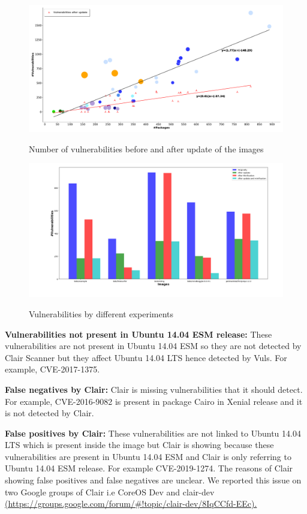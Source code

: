 \documentclass[a4paper,num-refs]{oup-contemporary}
\begin{document}
\begin{figure}[!ht]
        {\includegraphics[width=\textwidth]
        {Figures/vulnwithupdate.pdf}}
        \caption{\label{fig:graph2} Number of vulnerabilities before and
        after update of the images}
      \end{figure}


\begin{figure}[!ht]
        {\includegraphics[scale=1.5,width=\textwidth]
        {Figures/bargraph.png}}
        \caption{\label{fig:bargraph} Vulnerabilities by different experiments}
      \end{figure}
\textbf{Vulnerabilities not present in Ubuntu 14.04 ESM release:} These vulnerabilities are not present in Ubuntu 14.04 ESM so they 
are not detected by Clair Scanner but they affect Ubuntu 14.04 LTS hence detected by Vuls. For example, CVE-2017-1375.

\textbf{False negatives by Clair:} Clair is missing vulnerabilities that it should detect. For example, CVE-2016-9082 
is present in package Cairo in Xenial release and it is not detected by Clair.

\textbf{False positives by Clair:} These vulnerabilities are not linked to Ubuntu 14.04 LTS which is 
present inside the image but Clair is showing because these vulnerabilities are present in Ubuntu 14.04 ESM and 
Clair is only referring to Ubuntu 14.04 ESM release. For example CVE-2019-1274. The reasons of Clair showing
false positives and false negatives are unclear. We reported this issue on two Google groups of Clair i.e CoreOS Dev and
clair-dev \href{https://groups.google.com/forum/\#!topic/clair-dev/8IqCCfd-EEc}{(https://groups.google.com/forum/\#!topic/clair-dev/8IqCCfd-EEc).}
\end{document}
